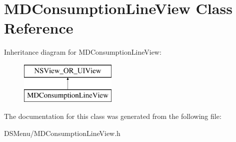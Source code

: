 \hypertarget{interface_m_d_consumption_line_view}{\section{M\-D\-Consumption\-Line\-View Class Reference}
\label{interface_m_d_consumption_line_view}
}
Inheritance diagram for M\-D\-Consumption\-Line\-View\-:\begin{figure}[H]
\begin{center}
\leavevmode
\includegraphics[height=2.000000cm]{interface_m_d_consumption_line_view}
\end{center}
\end{figure}


The documentation for this class was generated from the following file\-:\begin{DoxyCompactItemize}
\item 
D\-S\-Menu/M\-D\-Consumption\-Line\-View.\-h\end{DoxyCompactItemize}
